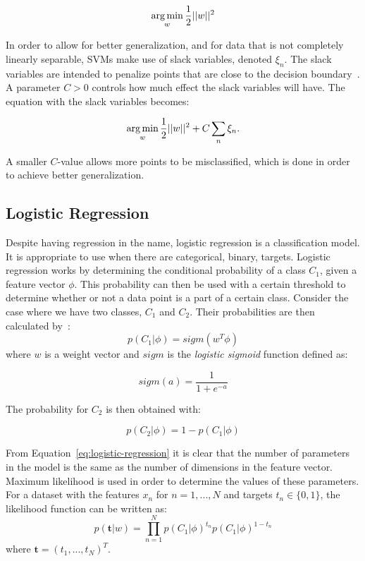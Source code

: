\begin{equation}
    \operatorname*{arg\,min}_{w}\frac{1}{2}||w||^2
\end{equation}

In order to allow for better generalization, and for data that is not completely linearly separable, SVMs make use of slack variables, denoted $\xi_n$.
The slack variables are intended to penalize points that are close to the decision boundary~\cite{bishop2006pattern}.
A parameter $C>0$ controls how much effect the slack variables will have.
The equation with the slack variables becomes:

\begin{equation}
    \operatorname*{arg\,min}_{w}\frac{1}{2}||w||^2 + C \sum_n\xi_n.
\end{equation}

A smaller $C$-value allows more points to be misclassified, which is done in order to achieve better generalization.

\subsection{Logistic Regression}

Despite having regression in the name, logistic regression is a classification model.
It is appropriate to use when there are categorical, binary, targets.
Logistic regression works by determining the conditional probability of a class $C_1$, given a feature vector $\phi$.
This probability can then be used with a certain threshold to determine whether or not a data point is a part of a certain class.
Consider the case where we have two classes, $C_1$ and $C_2$.
Their probabilities are then calculated by~\cite{bishop2006pattern}:
\begin{equation}\label{eq:logistic-regression}
    p(C_1|\phi) = sigm(w^T\phi)
\end{equation}
where $w$ is a weight vector and $sigm$ is the \textit{logistic sigmoid} function defined as:

\begin{equation}
    sigm(a) = \frac{1}{1+e^{-a}}
\end{equation}

The probability for $C_2$ is then obtained with:

\begin{equation}
    p(C_2|\phi) = 1 - p(C_1|\phi)
\end{equation}

From Equation~\ref{eq:logistic-regression} it is clear that the number of parameters in the model is the same as the number of dimensions in the feature vector.
Maximum likelihood is used in order to determine the values of these parameters.
For a dataset with the features $x_n$ for $n=1,...,N$ and targets $t_n \in \{0,1\}$, the likelihood function can be written as:
\begin{equation}
    p(\boldsymbol{t}|w) = \prod_{n=1}^N p(C_1|\phi)^{t_n}p(C_1|\phi)^{1-t_n}
\end{equation}
where $\boldsymbol{t} = (t_1, ..., t_N)^T$.

